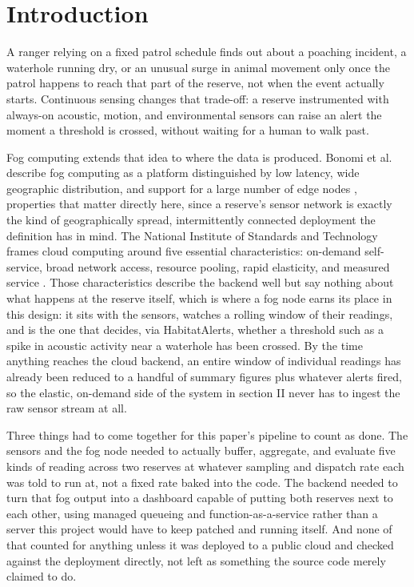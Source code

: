 \documentclass[conference,a4paper]{IEEEtran}
\begin{document}
\section{Introduction}

A ranger relying on a fixed patrol schedule finds out about a poaching incident, a waterhole running dry, or an unusual surge in animal movement only once the patrol happens to reach that part of the reserve, not when the event actually starts. Continuous sensing changes that trade-off: a reserve instrumented with always-on acoustic, motion, and environmental sensors can raise an alert the moment a threshold is crossed, without waiting for a human to walk past.

Fog computing extends that idea to where the data is produced. Bonomi et al. describe fog computing as a platform distinguished by low latency, wide geographic distribution, and support for a large number of edge nodes \cite{ref1}, properties that matter directly here, since a reserve's sensor network is exactly the kind of geographically spread, intermittently connected deployment the definition has in mind. The National Institute of Standards and Technology frames cloud computing around five essential characteristics: on-demand self-service, broad network access, resource pooling, rapid elasticity, and measured service \cite{ref2}. Those characteristics describe the backend well but say nothing about what happens at the reserve itself, which is where a fog node earns its place in this design: it sits with the sensors, watches a rolling window of their readings, and is the one that decides, via HabitatAlerts, whether a threshold such as a spike in acoustic activity near a waterhole has been crossed. By the time anything reaches the cloud backend, an entire window of individual readings has already been reduced to a handful of summary figures plus whatever alerts fired, so the elastic, on-demand side of the system in section II never has to ingest the raw sensor stream at all.

Three things had to come together for this paper's pipeline to count as done. The sensors and the fog node needed to actually buffer, aggregate, and evaluate five kinds of reading across two reserves at whatever sampling and dispatch rate each was told to run at, not a fixed rate baked into the code. The backend needed to turn that fog output into a dashboard capable of putting both reserves next to each other, using managed queueing and function-as-a-service rather than a server this project would have to keep patched and running itself. And none of that counted for anything unless it was deployed to a public cloud and checked against the deployment directly, not left as something the source code merely claimed to do.
\end{document}
